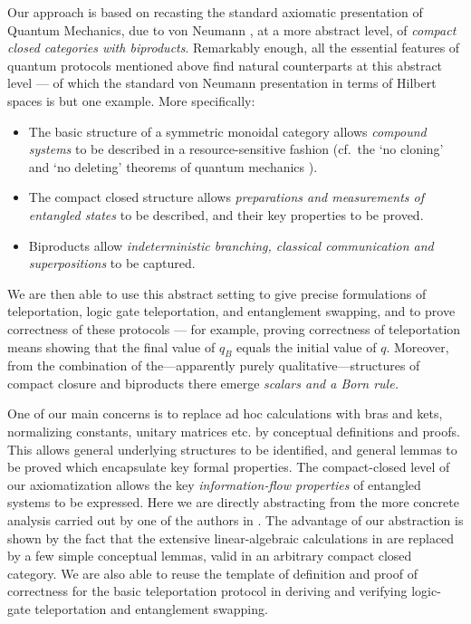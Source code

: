 \documentclass[10pt]{article}
\begin{document}
Our approach is based on recasting the standard axiomatic presentation 
of Quantum Mechanics, due to von Neumann \cite{vN}, at a more abstract
level, of \emph{compact closed categories with biproducts}.
Remarkably enough, all the essential features of quantum protocols
mentioned above find natural counterparts at this abstract level ---
of which the standard von Neumann presentation in terms of Hilbert
spaces is but one example. More specifically:
\begin{itemize} 
\item The basic structure of a symmetric monoidal category allows
  \emph{compound systems} to be described in a resource-sensitive
  fashion (cf.~the `no
  cloning' and `no deleting' theorems of quantum mechanics \cite{Nielsen}).
\item The compact closed structure allows \emph{preparations and 
    measurements of entangled states} to be described, and their
key
  properties to be proved.
\item Biproducts allow \emph{indeterministic branching, classical
communication  and superpositions} to
  be captured.
\end{itemize}
We are then able to use this abstract
setting to give precise formulations of teleportation, logic gate
teleportation, and entanglement swapping, and to prove correctness of
these protocols --- for example, proving correctness of teleportation
means showing that the final value of $q_B$ equals the initial value
of $q$. Moreover, from the combination  of the---apparently purely qualitative---structures
of compact closure and biproducts  there emerge \em scalars \em and a  \em
Born rule\em.

One of our main concerns is to replace ad hoc calculations with bras and kets,
normalizing constants, unitary matrices etc. by conceptual
  definitions and proofs. This allows general underlying structures to 
  be identified, and general lemmas to be proved which encapsulate key formal
  properties. The compact-closed level of our axiomatization allows
  the key \emph{information-flow properties} of entangled systems to be
  expressed. Here we are directly abstracting from the more concrete
  analysis carried out by one of the authors in \cite{Coe1,Coe2}. The advantage
of our abstraction is 
  shown by the fact that the extensive linear-algebraic calculations
  in \cite{Coe1} are replaced by a few simple conceptual lemmas, valid in an
  arbitrary compact closed category. We are also able to reuse the
  template of definition and proof of correctness for the basic
  teleportation protocol in deriving and verifying logic-gate
  teleportation and entanglement swapping.
\end{document}
